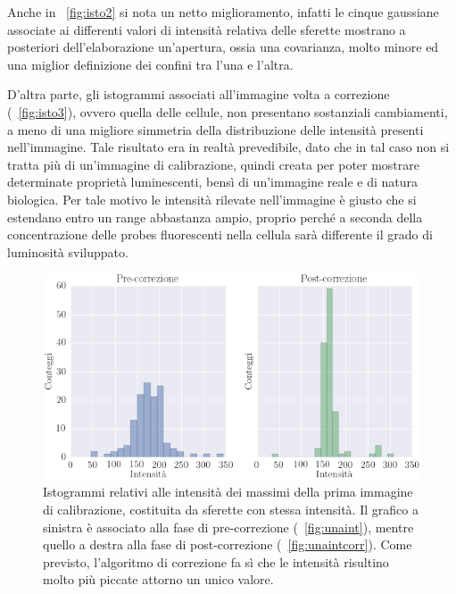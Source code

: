 Anche in \figurename~\ref{fig:isto2} si nota un netto miglioramento, infatti le cinque gaussiane associate ai differenti valori di intensità relativa delle sferette mostrano a posteriori dell'elaborazione un'apertura, ossia una covarianza, molto minore ed una miglior definizione dei confini tra l'una e l'altra. 

D'altra parte, gli istogrammi associati all'immagine volta a correzione (\figurename~\ref{fig:isto3}), ovvero quella delle cellule, non presentano sostanziali cambiamenti, a meno di una migliore simmetria della distribuzione delle intensità presenti nell'immagine.
Tale risultato era in realtà prevedibile, dato che in tal caso non si tratta più di un'immagine di calibrazione, quindi creata per poter mostrare determinate proprietà luminescenti, bensì di un'immagine reale e di natura biologica. 
Per tale motivo le intensità rilevate nell'immagine è giusto che si estendano entro un range abbastanza ampio, proprio perché a seconda della concentrazione delle probes fluorescenti nella cellula sarà differente il grado di luminosità sviluppato.

\begin{figure}
 \centering
 \includegraphics[scale=.55]{img/CAP4isto1.png}
 \caption{\small{Istogrammi relativi alle intensità dei massimi della prima immagine di calibrazione, costituita da sferette con stessa intensità. Il grafico a sinistra è associato alla fase di pre-correzione (\figurename~\ref{fig:unaint}), mentre quello a destra alla fase di post-correzione (\figurename~\ref{fig:unaintcorr}). Come previsto, l'algoritmo di correzione fa sì che le intensità risultino molto più piccate attorno un unico valore.}}
 \label{fig:isto1}
\end{figure}

